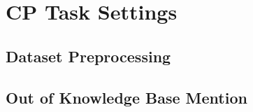 \section{CP Task Settings}\label{app_sec:constituency_parsing}

\subsection{Dataset Preprocessing}\label{appendix:dataset-preprocessing}
%

\subsection{Out of Knowledge Base Mention}\label{appendix:out-of-kb-mention}
%
%
%
%

